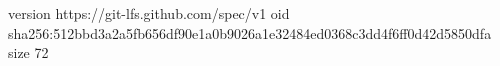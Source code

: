 version https://git-lfs.github.com/spec/v1
oid sha256:512bbd3a2a5fb656df90e1a0b9026a1e32484ed0368c3dd4f6ff0d42d5850dfa
size 72

